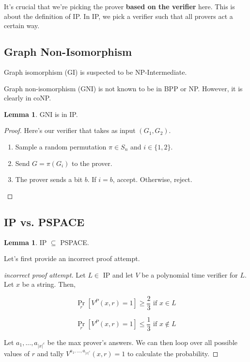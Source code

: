 \documentclass{article}
\theoremstyle{definition}
\newtheorem{lemma}[theorem]{Lemma}
\newcommand{\xtoc}{\lvert x \rvert ^{c}}
\begin{document}
It's crucial that we're picking the prover \textbf{based on the verifier} here. This is about
the definition of IP. In IP, we pick a verifier such that all provers act a certain way.

\subsection{Graph Non-Isomorphism}

Graph isomorphism (GI) is suspected to be NP-Intermediate.

Graph non-isomorphism (GNI) is not known to be in BPP or NP. However, it is clearly in coNP.

\begin{lemma}
    GNI is in IP.
\end{lemma}
\begin{proof}
    Here's our verifier that takes as input $(G_{1}, G_{2})$.

    \begin{enumerate}
        \item Sample a random permutation $\pi \in S_{n}$ and $i \in \{1,2\}$.
        \item Send $G = \pi(G_{i})$ to the prover.
        \item The prover sends a bit $b$. If $i = b$, accept. Otherwise, reject.
    \end{enumerate}
\end{proof}

\subsection{IP vs. PSPACE}

\begin{lemma}
    IP $\subseteq$ PSPACE.
\end{lemma}


Let's first provide an incorrect proof attempt.

\begin{proof}[incorrect proof attempt]
    Let $L \in$ IP and let $V$ be a polynomial time verifier for $L$. Let $x$ be a string. Then,

    \[ \Pr_{r}[V^{P}(x,r) = 1] \geq \frac{2}{3} \text{ if $x \in L$}\]

    \[ \Pr_{r}[V^{P}(x,r) = 1] \leq \frac{1}{3} \text{ if $x \notin L$}\]    

    Let $a_{1},...,a_{\xtoc}$ be the max prover's answers. We can then loop over all possible values of $r$ and tally $V^{a_{1},...,a_{\xtoc}}(x,r) = 1$ to calculate the probability.
\end{proof}
\end{document}
